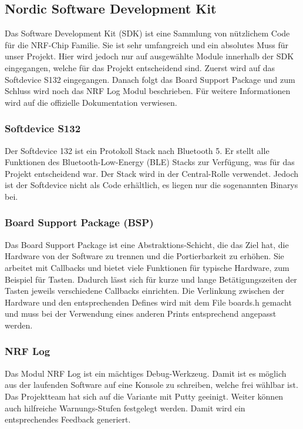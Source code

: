 \subsection{Nordic Software Development Kit}\label{sec:nordicsdk}

Das Software Development Kit (SDK) ist eine Sammlung von nützlichem Code für die NRF-Chip Familie. Sie ist sehr umfangreich und ein absolutes Muss für unser Projekt. Hier wird jedoch nur auf ausgewählte Module innerhalb der SDK eingegangen, welche für das Projekt entscheidend sind. Zuerst wird auf das Softdevice S132 eingegangen. Danach folgt das Board Support Package und zum Schluss wird noch das NRF Log Modul beschrieben. Für weitere Informationen wird auf die offizielle Dokumentation \cite{nordic_info} verwiesen.

\subsubsection*{Softdevice S132}
Der Softdevice 132 ist ein Protokoll Stack nach Bluetooth 5. Er stellt alle Funktionen des Bluetooth-Low-Energy (BLE) Stacks zur Verfügung, was für das Projekt entscheidend war. Der Stack wird in der Central-Rolle verwendet. Jedoch ist der Softdevice nicht als Code erhältlich, es liegen nur die sogenannten Binarys bei.

\subsubsection*{Board Support Package (BSP)}
Das Board Support Package ist eine Abstraktions-Schicht, die das Ziel hat, die Hardware von der Software zu trennen und die Portierbarkeit zu erhöhen. Sie arbeitet mit Callbacks und bietet viele Funktionen für typische Hardware, zum Beispiel für Tasten. Dadurch lässt sich für kurze und lange Betätigungszeiten der Tasten jeweils verschiedene Callbacks einrichten. Die Verlinkung zwischen der Hardware und den entsprechenden Defines wird mit dem File boards.h gemacht und muss bei der Verwendung eines anderen Prints entsprechend angepasst werden.

\subsubsection*{NRF Log}
Das Modul NRF Log ist ein mächtiges Debug-Werkzeug. Damit ist es möglich aus der laufenden Software auf eine Konsole zu schreiben, welche frei wählbar ist. Das Projektteam hat sich auf die Variante mit Putty geeinigt. Weiter können auch hilfreiche Warnungs-Stufen festgelegt werden. Damit wird ein entsprechendes Feedback generiert.
